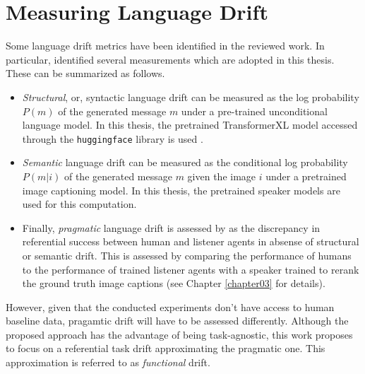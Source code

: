 \section{Measuring Language Drift}

Some language drift metrics have been identified in the reviewed work. In particular, \cite{lazaridou2020multi} identified several measurements which are adopted in this thesis. These can be summarized as follows. 
\begin{itemize}
	\item \textit{Structural}, or, syntactic language drift can be measured as the log probability $P(m)$ of the generated message $m$ under a pre-trained unconditional language model. In this thesis, the pretrained TransformerXL model accessed through the \texttt{huggingface} library is used \parencite{dai2019transformer, wolf2019huggingface}.
	\item \textit{Semantic} language drift can be measured as the conditional log probability $P(m|i)$ of the generated message $m$ given the image $i$ under a pretrained image captioning model. In this thesis, the pretrained speaker models are used for this computation. %
	\item Finally, \textit{pragmatic} language drift is assessed by \cite{lazaridou2020multi} as the discrepancy in referential success between human and listener agents in absense of structural or semantic drift. This is assessed by comparing the performance of humans to the performance of trained listener agents with a speaker trained to rerank the ground truth image captions (see Chapter \ref{chapter03} for details). 
\end{itemize}

However, given that the conducted experiments don't have access to human baseline data, pragamtic drift will have to be assessed differently. Although the proposed approach has the advantage of being task-agnostic, this work proposes to focus on a referential task drift approximating the pragmatic one. This approximation is referred to as \textit{functional} drift. 

